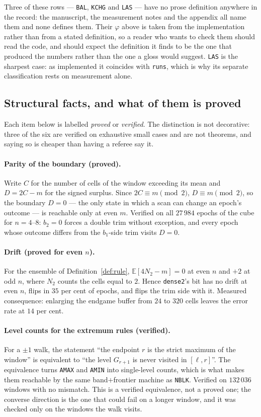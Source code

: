 Three of these rows --- \texttt{BAL}, \texttt{KCHG} and \texttt{LAS} --- have no prose definition
anywhere in the record: the manuscript, the measurement notes and the appendix all name them and
none defines them. Their $\varphi$ above is taken from the implementation rather than from a stated
definition, so a reader who wants to check them should read the code, and should expect the
definition it finds to be the one that produced the numbers rather than the one a gloss would
suggest. \texttt{LAS} is the sharpest case: as implemented it coincides with \texttt{runs}, which is
why its separate classification rests on measurement alone.

\subsection{Structural facts, and what of them is proved}\label{app:proofs}

Each item below is labelled \emph{proved} or \emph{verified}. The distinction is not decorative: three
of the six are verified on exhaustive small cases and are not theorems, and saying so is cheaper than
having a referee say it.

\paragraph{Parity of the boundary (proved).} Write $C$ for the number of cells of the window exceeding
its mean and $D=2C-m$ for the signed surplus. Since $2C\equiv m \pmod 2$, $D\equiv m\pmod 2$, so the
boundary $D=0$ --- the only state in which a scan can change an epoch's outcome --- is reachable only
at even $m$. Verified on all $27\,984$ epochs of the cube for $n=4$--$8$: $b_2=0$ forces a double trim
without exception, and every epoch whose outcome differs from the $b_1$-side trim visits $D=0$.

\paragraph{Drift (proved for even $n$).} For the ensemble of Definition~\ref{def:rule},
$\mathbb E[4N_2-m]=0$ at even $n$ and $+2$ at odd $n$, where $N_2$ counts the cells equal to $2$. Hence
\texttt{dense2}'s bit has no drift at even $n$, flips in $35$ per cent of epochs, and flips the trim
side with it. Measured consequence: enlarging the endgame buffer from $24$ to $320$ cells leaves the
error rate at $14$ per cent.

\paragraph{Level counts for the extremum rules (verified).} For a $\pm1$ walk, the statement ``the
endpoint $r$ is the strict maximum of the window'' is equivalent to ``the level $G_{r+1}$ is never
visited in $[\ell,r]$''. The equivalence turns \texttt{AMAX} and \texttt{AMIN} into single-level
counts, which is what makes them reachable by the same band$+$frontier machine as \texttt{NBLK}.
Verified on $132\,036$ windows with no mismatch. This is a verified equivalence, not a proved one; the
converse direction is the one that could fail on a longer window, and it was checked only on the
windows the walk visits.


